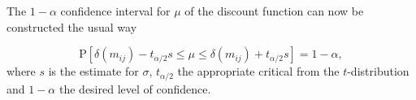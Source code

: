  The $1- \alpha$ confidence interval for $\mu$ of the discount function can now be constructed the usual way

\begin{equation}
\label{eq:cint}
\mbox{P}\left[ \delta(m_{ij}) - t_{\alpha / 2} s   \leq \mu  \leq \delta(m_{ij})  + t_{\alpha / 2} s\right]= 1 - \alpha,
\end{equation} 
where $s$ is the estimate for $\sigma$, $t_{\alpha / 2}$ the appropriate critical from the $t$-distribution and $1-\alpha$ the desired level of confidence. 




















